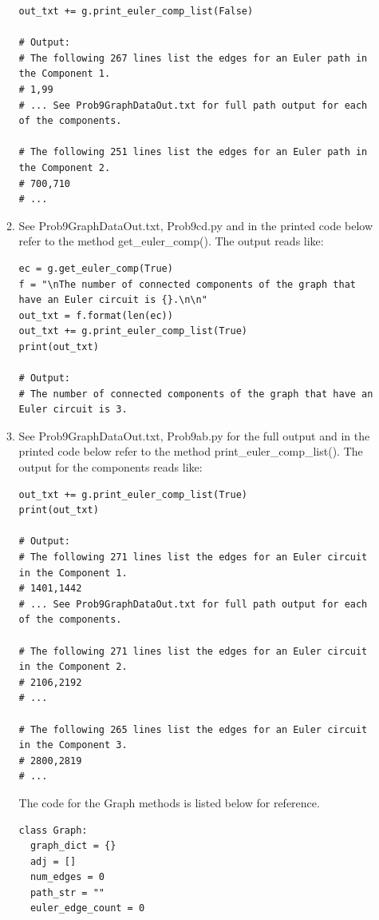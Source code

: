 \documentclass{article}
\begin{document}
\begin{enumerate}
\begin{enumerate}
    \begin{lstlisting}
out_txt += g.print_euler_comp_list(False)

# Output:
# The following 267 lines list the edges for an Euler path in the Component 1.
# 1,99
# ... See Prob9GraphDataOut.txt for full path output for each of the components.

# The following 251 lines list the edges for an Euler path in the Component 2.
# 700,710
# ...
    \end{lstlisting}

    \item See Prob9GraphDataOut.txt, Prob9cd.py and in the printed code below refer to the method get\_euler\_comp(). The output reads like:
    
    \begin{lstlisting}
ec = g.get_euler_comp(True)
f = "\nThe number of connected components of the graph that have an Euler circuit is {}.\n\n"
out_txt = f.format(len(ec))
out_txt += g.print_euler_comp_list(True)
print(out_txt)

# Output:
# The number of connected components of the graph that have an Euler circuit is 3.
    \end{lstlisting}

    \item See Prob9GraphDataOut.txt, Prob9ab.py for the full output and in the printed code below refer to the method print\_euler\_comp\_list(). The output for the components reads like:
    
    \begin{lstlisting}
out_txt += g.print_euler_comp_list(True)
print(out_txt)

# Output:
# The following 271 lines list the edges for an Euler circuit in the Component 1.
# 1401,1442
# ... See Prob9GraphDataOut.txt for full path output for each of the components.

# The following 271 lines list the edges for an Euler circuit in the Component 2.
# 2106,2192
# ...

# The following 265 lines list the edges for an Euler circuit in the Component 3.
# 2800,2819
# ...
    \end{lstlisting}

    The code for the Graph methods is listed below for reference.

    \begin{lstlisting}
class Graph:    
  graph_dict = {}
  adj = []
  num_edges = 0
  path_str = ""
  euler_edge_count = 0


\end{lstlisting}
\end{enumerate}
\end{enumerate}
\end{document}
